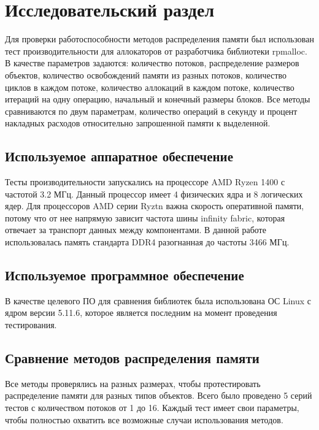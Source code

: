 \chapter{Исследовательский раздел}
Для проверки работоспособности методов распределения памяти был использован тест производительности для аллокаторов от разработчика библиотеки rpmalloc\cite{rpmalloc-bench}. В качестве параметров задаются: количество потоков, распределение размеров объектов, количество освобождений памяти из разных потоков, количество циклов в каждом потоке, количество аллокаций в каждом потоке, количество итераций на одну операцию, начальный и конечный размеры блоков. Все методы сравниваются по двум параметрам, количество операций в секунду и процент накладных расходов относительно запрошенной памяти к выделенной.

\section{Используемое аппаратное обеспечение}
Тесты производительности запускались на процессоре AMD Ryzen 1400  с частотой 3.2 МГц. Данный процессор имеет 4 физических ядра и 8 логических ядер. Для процессоров AMD серии Ryztn важна скорость оперативной памяти, потому что от нее напрямую зависит частота шины infinity fabric\cite{infinity-fabric}, которая отвечает за транспорт данных между компонентами. В данной работе использовалась память стандарта DDR4 разогнанная до частоты 3466 МГц.

\section{Используемое программное обеспечение}
В качестве целевого ПО для сравнения библиотек была использована ОС Linux с ядром версии 5.11.6, которое является последним на момент проведения тестирования.

\section{Сравнение методов распределения памяти}
Все методы проверялись на разных размерах, чтобы протестировать распределение памяти для разных типов объектов.  Всего было проведено 5 серий тестов с количеством потоков от 1 до 16. Каждый тест имеет свои параметры, чтобы полностью охватить все возможные случаи использования методов.

